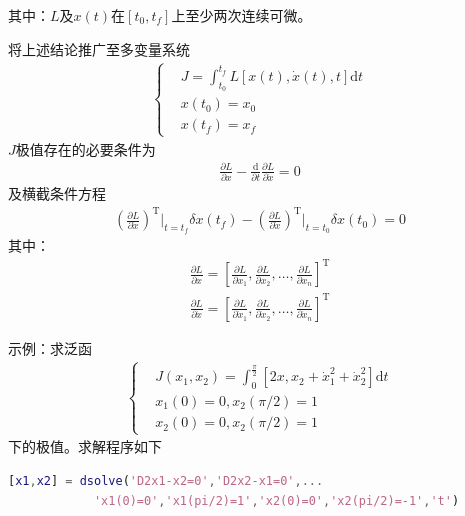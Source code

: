             其中：$L$及$x(t)$在$[t_0,t_f]$上至少两次连续可微。
            \par
            将上述结论推广至多变量系统
            \begin{align*}
            \left\{
            \begin{aligned}
            & J = \int_{t_0}^{t_f}L[x(t),\dot{x}(t),t]\mathrm{d}t\\
            & x(t_0) = x_0\\
            & x(t_f) = x_f
            \end{aligned}
            \right.
            \end{align*}
            $J$极值存在的必要条件为
            \begin{align*}
            \frac{\partial L}{\partial x} - \frac{\mathrm{d} }{\partial t}\frac{\partial L}{\partial \dot{x}} = 0
            \end{align*}
            及横截条件方程
            \begin{align*}
            \left( \frac{\partial L}{\partial \dot{x}} \right) ^\mathrm{T}\Big|_{t = t_f}\delta x(t_f) - \left( \frac{\partial L}{\partial \dot{x}} \right) ^\mathrm{T}\Big|_{t=t_0}\delta x(t_0) = 0
            \end{align*}
            其中：
            \begin{align*}
            \frac{\partial L}{\partial x} = \left[\frac{\partial L}{\partial x_1},\frac{\partial L}{\partial x_2} ,\dots, \frac{\partial L}{\partial x_n}\right]^\mathrm{T}\\
            \frac{\partial L}{\partial \dot{x}} = \left[\frac{\partial L}{\partial \dot{x}_1},\frac{\partial L}{\partial \dot{x}_2} ,\dots, \frac{\partial L}{\partial \dot{x}_n}\right]^\mathrm{T}
            \end{align*}
            \par
            示例：求泛函
            \begin{align*}
            \left\{
            \begin{aligned}
            & J(x_1,x_2) = \int_{0}^{\frac{\pi}{2}} [2x,x_2+\dot{x}_1^2+\dot{x}_2^2]\mathrm{d}t\\
            & x_1(0) = 0,x_2({\pi}/{2}) = 1\\
            & x_2(0) = 0,x_2({\pi}/{2})=1
            \end{aligned}\right.
            \end{align*}
            下的极值。求解程序如下
            \begin{lstlisting}[language = Matlab]
            [x1,x2] = dsolve('D2x1-x2=0','D2x2-x1=0',...
            'x1(0)=0','x1(pi/2)=1','x2(0)=0','x2(pi/2)=-1','t')
            \end{lstlisting}

